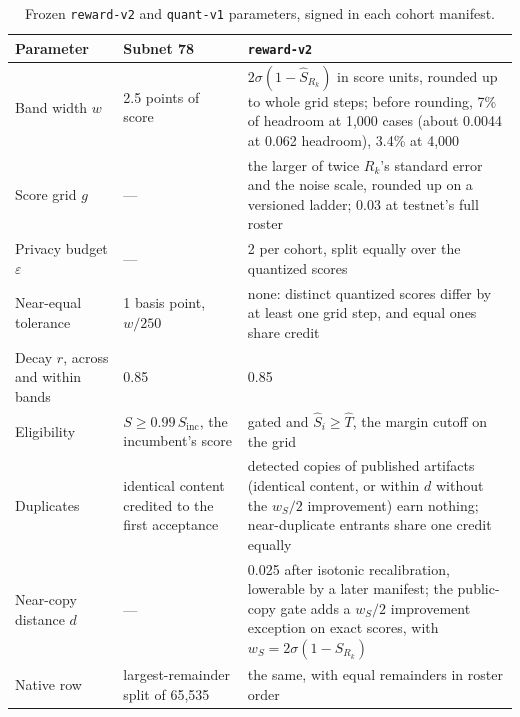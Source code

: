 \begin{table}[H]
\centering
\begin{tabularx}{\linewidth}{@{}lLL@{}}
\toprule
Parameter & Subnet 78 & \texttt{reward-v2} \\
\midrule
Band width \(w\) & 2.5 points of score & \(2\sigma(1-\hat S_{R_k})\) in score
units, rounded up to whole grid steps; before rounding, 7\% of headroom at
1,000 cases (about 0.0044 at 0.062 headroom), 3.4\% at 4,000 \\
Score grid \(g\) & --- & the larger of twice \(R_k\)'s standard error and the
noise scale, rounded up on a versioned ladder; 0.03 at testnet's full roster \\
Privacy budget \(\varepsilon\) & --- & 2 per cohort, split equally over the
quantized scores \\
Near-equal tolerance & 1 basis point, \(w/250\) & none: distinct quantized
scores differ by at least one grid step, and equal ones share credit \\
Decay \(r\), across and within bands & 0.85 & 0.85 \\
Eligibility & \(S\geq0.99\,S_{\mathrm{inc}}\), the incumbent's score & gated and
\(\hat S_i\geq\hat T\), the margin cutoff on the grid \\
Duplicates & identical content credited to the first acceptance & detected
copies of published artifacts (identical content, or within \(d\) without the
\(w_S/2\) improvement) earn nothing; near-duplicate entrants share one credit
equally \\
Near-copy distance \(d\) & --- & 0.025 after isotonic recalibration, lowerable
by a later manifest; the public-copy gate adds a \(w_S/2\) improvement
exception on exact scores, with \(w_S=2\sigma(1-S_{R_k})\) \\
Native row & largest-remainder split of 65,535 & the same, with equal
remainders in roster order \\
\bottomrule
\end{tabularx}
\caption{Frozen \texttt{reward-v2} and \texttt{quant-v1} parameters, signed in
each cohort manifest.}
\label{tab:reward-v1-parameters}
\end{table}

